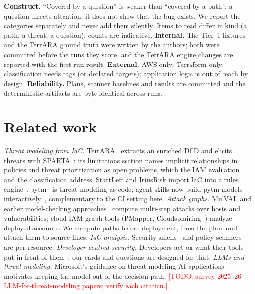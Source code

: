 \documentclass[sigconf,review,anonymous]{acmart}
\newcommand{\todo}[1]{\textcolor{red}{[TODO: #1]}}
\begin{document}
\textbf{Construct.} ``Covered by a question'' is weaker than ``covered by a path'': a question directs attention, it does not
show that the bug exists. We report the categories separately and never add them silently. Items to read differ in kind
(a path, a threat, a question); counts are indicative. \textbf{Internal.} The Tier~1 fixtures and the TerrARA ground truth
were written by the authors; both were committed before the runs they score, and the TerrARA engine changes are reported with
the first-run result. \textbf{External.} AWS only; Terraform only; classification needs tags (or declared targets);
application logic is out of reach by design. \textbf{Reliability.} Plans, scanner baselines and results are committed and
the deterministic artifacts are byte-identical across runs.

\section{Related work}

\emph{Threat modeling from IaC.} TerrARA~\cite{tran2025terrara} extracts an enriched DFD and elicits threats with
SPARTA~\cite{sion2018sparta}; its limitations section names implicit relationships in policies and threat prioritization as
open problems, which the IAM evaluation and the classification address. StartLeft and IriusRisk import IaC into a rules
engine~\cite{startleft,iriusrisk-terraform}. pytm~\cite{pytm} is threat modeling as code; agent skills now build pytm models
interactively~\cite{tmskills}, complementary to the CI setting here. \emph{Attack graphs.} MulVAL and earlier model-checking
approaches~\cite{ou2005mulval,sheyner2002attackgraphs} compute multi-step attacks over hosts and vulnerabilities; cloud IAM
graph tools (PMapper, Cloudsplaining~\cite{pmapper,cloudsplaining}) analyze deployed accounts. We compute paths before
deployment, from the plan, and attach them to source lines. \emph{IaC analysis.} Security smells~\cite{rahman2019sevensins}
and policy scanners~\cite{checkov,trivy} are per-resource. \emph{Developer-centred security.} Developers act on what their
tools put in front of them~\cite{acar2016sources,tahaei2019survey}; our cards and questions are designed for that.
\emph{LLMs and threat modeling.} Microsoft's guidance on threat modeling AI applications~\cite{ms2026threatai} motivates
keeping the model out of the decision path. \todo{survey 2025--26 LLM-for-threat-modeling papers; verify each citation.}
\end{document}
